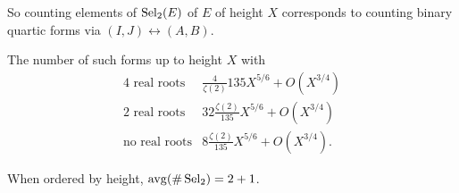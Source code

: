 So counting elements of $\operatorname{Sel}_2(E)$ of $E$ of height $X$ corresponds to counting 
binary quartic forms via $(I,J)\leftrightarrow (A,B)$. 

\begin{theorem}
The number of such forms up to height $X$ with 
\begin{align*}
  4\text{ real roots} & \frac{4}{\zeta(2)}{135} X^{5/6}+O(X^{3/4}) \\
  2\text{ real roots} & 32 \frac{\zeta(2)}{135} X^{5/6} + O(X^{3/4}) \\
  \text{no real roots} & 8 \frac{\zeta(2)}{135} X^{5/6} + O(X^{3/4}) .
\end{align*}
\end{theorem}

\begin{corollary}
When ordered by height, $\operatorname{avg}(\#\operatorname{Sel}_2)=2+1$. 
\end{corollary}

